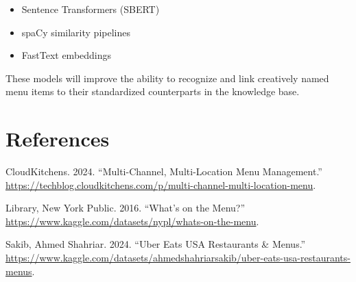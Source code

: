 \documentclass[
  11pt,
  a4paper,
  DIV=11,
  numbers=noendperiod]{scrartcl}
\providecommand{\tightlist}{%
  \setlength{\itemsep}{0pt}\setlength{\parskip}{0pt}}\usepackage{longtable,booktabs,array}
\newlength{\cslhangindent}
\newenvironment{CSLReferences}[2] %
 {\begin{list}{}{%
  \setlength{\itemindent}{0pt}
  \setlength{\leftmargin}{0pt}
  \setlength{\parsep}{0pt}
  \ifodd #1
   \setlength{\leftmargin}{\cslhangindent}
   \setlength{\itemindent}{-1\cslhangindent}
  \fi
  \setlength{\itemsep}{#2\baselineskip}}}
 {\end{list}}
\begin{document}
\begin{itemize}
\tightlist
\item
  Sentence Transformers (SBERT)\\
\item
  spaCy similarity pipelines\\
\item
  FastText embeddings
\end{itemize}

These models will improve the ability to recognize and link creatively
named menu items to their standardized counterparts in the knowledge
base.

\newpage{}

\section*{References}\label{references}

\label{refs}
\begin{CSLReferences}{1}{0}
CloudKitchens. 2024. {``Multi-Channel, Multi-Location Menu
Management.''}
\url{https://techblog.cloudkitchens.com/p/multi-channel-multi-location-menu}.

Library, New York Public. 2016. {``What's on the Menu?''}
\url{https://www.kaggle.com/datasets/nypl/whats-on-the-menu}.

Sakib, Ahmed Shahriar. 2024. {``Uber Eats USA Restaurants \& Menus.''}
\url{https://www.kaggle.com/datasets/ahmedshahriarsakib/uber-eats-usa-restaurants-menus}.

\end{CSLReferences}
\end{document}
